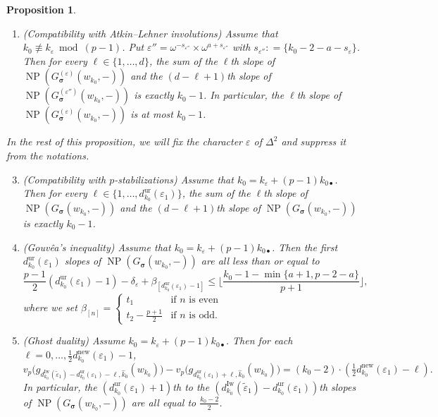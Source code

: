 \documentclass[12pt]{amsart}
\newtheorem{proposition}[subsection]{Proposition}
\theoremstyle{definition}
\numberwithin{equation}{subsection}
\DeclareMathOperator{\NP}{NP}
\newcommand{\bbsigma}{\boldsymbol{\sigma}}
\newcommand{\new}{\mathrm{new}}
\newcommand{\Iw}{\mathrm{Iw}}
\newcommand{\ur}{\mathrm{ur}}
\begin{document}
\begin{proposition}
\begin{enumerate}
\item (Compatibility with Atkin--Lehner involutions)
Assume that ${k_0}\not \equiv k_\varepsilon \bmod{(p-1)}$.
Put $\varepsilon'' = \omega^{-s_{\varepsilon''}} \times \omega^{a+s_{\varepsilon''}}$ with $s_{\varepsilon''}: = \{{k_0}-  2-a-s_\varepsilon\}$.  Then for every $\ell \in \{1, \dots, d\}$, the sum of the $\ell$th slope of $\NP(G_{\bbsigma}^{(\varepsilon)}(w_{k_0}, -))$ and the $(d-\ell+1)$th slope of $\NP(G_{\bbsigma}^{(\varepsilon'')}(w_{k_0}, -))$ is exactly ${k_0}-1$.
In particular, the $\ell$th slope of $\NP(G_{\bbsigma}^{(\varepsilon)}(w_{k_0}, -))$ is at most $k_0-1$.
\end{enumerate}
In the rest of this proposition, we will fix the character $\varepsilon$ of $\Delta^2$ and suppress it from the notations.
\begin{enumerate}\setcounter{enumi}{2}
\item (Compatibility with $p$-stabilizations)
Assume that ${k_0} = k_\varepsilon + (p-1)k_{0\bullet}$. Then for every $\ell \in \{1, \dots, d_{k_0}^\ur(\varepsilon_1)\}$, the sum of the $\ell$th slope of $\NP(G_{\bbsigma}(w_{k_0}, -))$ and the $(d-\ell+1)$th slope of $\NP(G_{\bbsigma}(w_{k_0}, -))$ is exactly ${k_0}-1$.
\item (Gouv\^ea's inequality) Assume that ${k_0} = k_\varepsilon + (p-1)k_{0\bullet}$. Then the first $d_{k_0}^\ur(\varepsilon_1)$ slopes of $\NP(G_{\bbsigma}(w_{k_0}, -))$ are all less than or equal to
\begin{equation}
\label{E:gouvea maximal slope}
\frac{p-1}2(d_{k_0}^\ur(\varepsilon_1)-1)-\delta_\varepsilon + \beta_{[d_{k_0}^\ur(\varepsilon_1)-1]} \leq \Big\lfloor \frac{k_0-1-\min\{a+1, p-2-a\}}{p+1}\Big\rfloor,
\end{equation}
where we set $\beta_{[n]} =\begin{cases}
t_1 & \textrm{if }n \textrm{ is even}
\\
t_2-
\tfrac{p+1}2 & \textrm{if }n \textrm{ is odd}.
\end{cases}$

\item (Ghost duality)
Assume ${k_0} = k_\varepsilon + (p-1)k_{0\bullet}$.
Then for each $\ell = 0, \dots,\frac 12 d_{k_0}^{\new}(\varepsilon_1)-1$,
\begin{equation}
\label{E:ghost duality}
v_p\big(g_{d_{k_0}^\Iw(\tilde \varepsilon_1) - d_{k_0}^\ur(\varepsilon_1) -\ell, \hat k_0} (w_{k_0}) \big) - v_p\big(g_{ d_{k_0}^\ur(\varepsilon_1) +\ell, \hat k_0} (w_{k_0}) \big) = ({k_0}-2) \cdot (\tfrac 12d_{k_0}^{\new}(\varepsilon_1) - \ell).
\end{equation}
In particular, the $(d_{k_0}^\ur(\varepsilon_1)+1)$th to the $(d_{k_0}^\Iw(\tilde \varepsilon_1)-d_{k_0}^\ur(\varepsilon_1))$th slopes of $\NP(G_{\bbsigma}(w_{k_0},-))$ are all equal to $\frac{{k_0}-2}2$. 



\end{enumerate}
\end{proposition}
\end{document}

